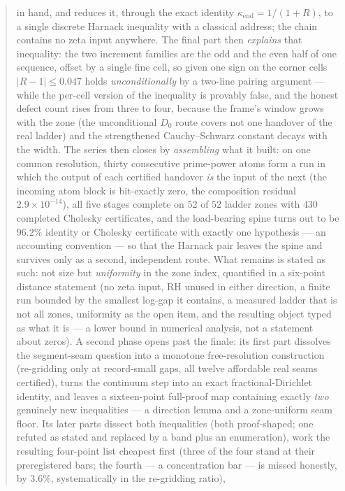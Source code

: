 \documentclass[11pt,a4paper]{article}
\begin{document}
\begin{abstract}
in hand, and reduces it, through the exact identity $\kappa_{\mathrm{end}}=1/(1+R)$, to a
single discrete Harnack inequality with a classical address; the chain contains no zeta input
anywhere. The final part then \emph{explains} that inequality: the two increment families are
the odd and the even half of one sequence, offset by a single fine cell, so given one sign on
the corner cells $|R-1|\le0.047$ holds \emph{unconditionally} by a two-line pairing argument
--- while the per-cell version of the inequality is provably false, and the honest defect count
rises from three to four, because the frame's window grows with the zone (the unconditional
$D_0$ route covers not one handover of the real ladder) and the strengthened Cauchy--Schwarz
constant decays with the width. The series then closes by \emph{assembling} what it built: on one
common resolution, thirty consecutive prime-power atoms form a run in which the output of each
certified handover \emph{is} the input of the next (the incoming atom block is bit-exactly zero, the
composition residual $2.9\times10^{-14}$), all five stages complete on $52$ of $52$ ladder zones with
$430$ completed Cholesky certificates, and the load-bearing spine turns out to be $96.2\%$ identity
or Cholesky certificate with exactly one hypothesis --- an accounting convention --- so that the
Harnack pair leaves the spine and survives only as a second, independent route. What remains is
stated as such: not size but \emph{uniformity} in the zone index, quantified in a six-point distance
statement (no zeta input, RH unused in either direction, a finite run bounded by the smallest log-gap
it contains, a measured ladder that is not all zones, uniformity as the open item, and the resulting
object typed as what it is --- a lower bound in numerical analysis, not a statement about zeros).
A second phase opens past the finale: its first part dissolves the segment-seam question into a
monotone free-resolution construction (re-gridding only at record-small gaps, all twelve affordable
real seams certified), turns the continuum step into an exact fractional-Dirichlet identity, and
leaves a sixteen-point full-proof map containing exactly \emph{two} genuinely new inequalities ---
a direction lemma and a zone-uniform seam floor. Its later parts dissect both inequalities (both
proof-shaped; one refuted as stated and replaced by a band plus an enumeration), work the resulting
four-point list cheapest first (three of the four stand at their preregistered bars; the fourth ---
a concentration bar --- is missed honestly, by $3.6\%$, systematically in the re-gridding ratio),

\end{abstract}
\end{document}
